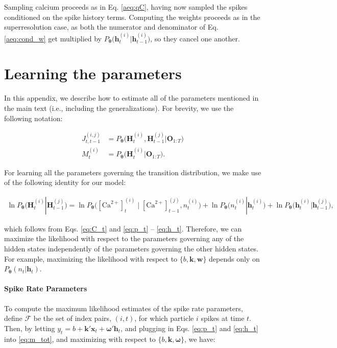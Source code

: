 \documentclass[10pt]{article}
\providecommand{\ve}[1]{\boldsymbol{#1}}
\providecommand{\ve}[1]{\boldsymbol{#1}}
\newcommand{\thetn}{\ve{\theta}}
\newcommand{\p}{P_{\thetn}}
\newcommand{\Ca}{[\text{Ca}^{2+}]}
\begin{document}
Sampling calcium proceeds as in Eq. \ref{aeq:qC}, having now sampled the spikes conditioned on the spike history terms.  Computing the weights proceeds as in the superresolution case, as both the numerator and denominator of Eq. \ref{aeq:cond_w} get multiplied by $\p\big(\ve{h}_t^{(i)} | \ve{h}_{t-1}^{(i)}\big)$, so they cancel one another.

\section{Learning the parameters} \label{sec:mstep}

In this appendix, we describe how to estimate all of the parameters mentioned in the main text (i.e., including the generalizations).  For brevity, we use the following notation:

\begin{align*}
J_{t,t-1}^{(i,j)} &= \p\big(\ve{H}_t^{(i)}, \ve{H}_{t-1}^{(j)} | \ve{O}_{1:T}\big) \\
M_{t}^{(i)} &= \p\big(\ve{H}_t^{(i)} | \ve{O}_{1:T}\big). 
\end{align*}

\noindent For learning all the parameters governing the transition distribution, we make use of the following identity for our model:

\begin{multline}
\ln \p\big(\ve{H}_t^{(i)} | \ve{H}_{t-1}^{(j)}\big) =
\ln \p\big(\Ca_t^{(i)} \mid \Ca_{t-1}^{(j)}, n_t^{(i)}\big) + \ln \p\big(n_t^{(i)} | \ve{h}_t^{(i)}\big) + \ln \p\big(\ve{h}_t^{(i)} | \ve{h}_{t-1}^{(j)}\big),
\end{multline}

\noindent which follows from Eqs. \ref{eq:C_t} and \ref{eq:p_t} -- \ref{eq:h_t}. Therefore, we can maximize the likelihood with respect to the parameters governing any of the hidden states independently of the parameters governing the other hidden states. For example, maximizing the likelihood with respect to $\{b, \ve{k}, \ve{w}\}$ depends only on $\p(n_t | \ve{h}_t)$. 

\paragraph{Spike Rate Parameters} 

To compute the maximum likelihood estimates of the spike rate parameters, define $\mathcal{F}$ be the set of index pairs, $(i,t)$, for which particle $i$ spikes at time $t$.  Then, by letting $y_t=b+\ve{k}' \ve{x}_t+ \ve{\omega}' \ve{h}_t$, and plugging in Eqs. \ref{eq:p_t} and \ref{eq:h_t} into \ref{eq:m_tot}, and maximizing with respect to $\{b, \ve{k}, \ve{\omega}\}$, we have:
\end{document}
